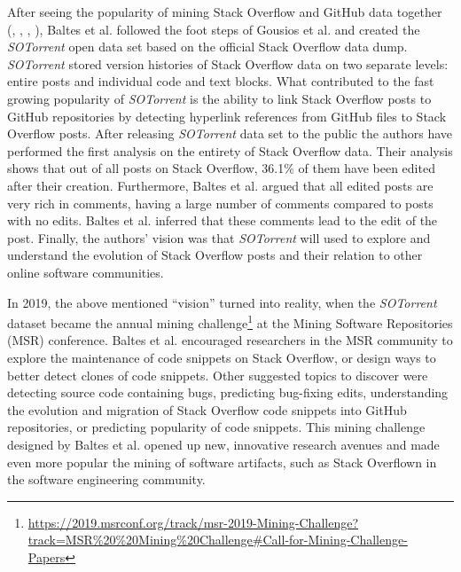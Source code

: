         After seeing the popularity of mining Stack Overflow and GitHub data together (\cite{vasilescu2013stackoverflow}, \cite{lee2017github}, \cite{badashian2014involvement}, \cite{yang2017stack}), Baltes et al. \cite{baltes2018sotorrent} followed the foot steps of Gousios et al. \cite{gousios2013ghtorent} and created the \emph{SOTorrent} open data set based on the official Stack Overflow data dump. \emph{SOTorrent} stored version histories of Stack Overflow data on two separate levels: entire posts and individual code and text blocks. What contributed to the fast growing popularity of \emph{SOTorrent} is the ability to link Stack Overflow posts to GitHub repositories by detecting hyperlink references from GitHub files to Stack Overflow posts. After releasing \emph{SOTorrent} data set to the public the authors have performed the first analysis on the entirety of Stack Overflow data. Their analysis shows that out of all posts on Stack Overflow, 36.1\% of them have been edited after their creation. Furthermore, Baltes et al. argued that all edited posts are very rich in comments, having a large number of comments compared to posts with no edits. Baltes et al. inferred that these comments lead to the edit of the post.
        Finally, the authors' vision was that \emph{SOTorrent} will used to explore and understand the evolution of Stack Overflow posts and their relation to other online software communities.
        
        In 2019, the above mentioned ``vision'' turned into reality, when the \emph{SOTorrent} dataset became the annual mining challenge\footnote{\url{https://2019.msrconf.org/track/msr-2019-Mining-Challenge?track=MSR\%20\%20Mining\%20Challenge\#Call-for-Mining-Challenge-Papers}} at the Mining Software Repositories (MSR) conference. Baltes et al. \cite{baltes2019sotorrent} encouraged researchers in the MSR community to explore the maintenance of code snippets on Stack Overflow, or design ways to better detect clones of code snippets. Other suggested topics to discover were detecting source code containing bugs, predicting bug-fixing edits, understanding the evolution and migration of Stack Overflow code snippets into GitHub repositories, or predicting popularity of code snippets. This mining challenge designed by Baltes et al. \cite{baltes2019sotorrent} opened up new, innovative research avenues and made even more popular the mining of software artifacts, such as Stack Overflown in the software engineering community. 
        
